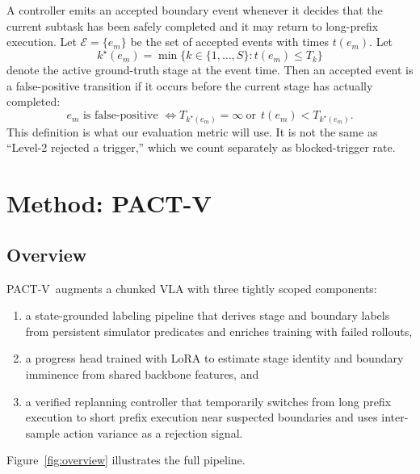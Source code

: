 \documentclass[10pt]{article}
\newcommand{\method}{\textsc{PACT-V}\xspace}
\newcommand{\Sstages}{S}
\begin{document}
A controller emits an accepted boundary event whenever it decides that the
current subtask has been safely completed and it may return to long-prefix
execution.
Let $\mathcal{E}=\{e_m\}$ be the set of accepted events with times $t(e_m)$.
Let
\[
  k^\star(e_m)=\min\{k \in \{1,\dots,\Sstages\}: t(e_m) \le T_k\}
\]
denote the active ground-truth stage at the event time.
Then an accepted event is a false-positive transition if it occurs before the
current stage has actually completed:
\begin{equation}
  e_m \text{ is false-positive }
  \Longleftrightarrow
  T_{k^\star(e_m)}=\infty
  \ \text{or}\ \ t(e_m) < T_{k^\star(e_m)}.
  \label{eq:fptdef}
\end{equation}
This definition is what our evaluation metric will use.
It is not the same as ``Level-2 rejected a trigger,'' which we count separately
as blocked-trigger rate.

\section{Method: \method}

\subsection{Overview}

\method\ augments a chunked VLA with three tightly scoped components:
\begin{enumerate}[leftmargin=1.5em, itemsep=0.2em]
  \item a state-grounded labeling pipeline that derives stage and boundary
  labels from persistent simulator predicates and enriches training with failed
  rollouts,
  \item a progress head trained with LoRA to estimate stage identity and
  boundary imminence from shared backbone features, and
  \item a verified replanning controller that temporarily switches from long
  prefix execution to short prefix execution near suspected boundaries and uses
  inter-sample action variance as a rejection signal.
\end{enumerate}

Figure~\ref{fig:overview} illustrates the full pipeline.
\end{document}
